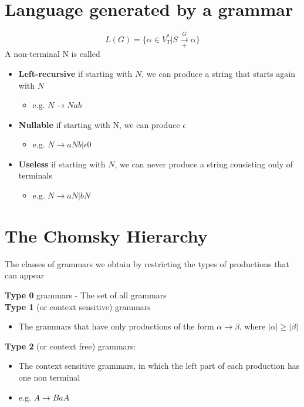 \documentclass{article}[18pt]
\begin{document}
\section{Language generated by a grammar}
$$L(G)=\{\alpha\in V^*_T| S\xrightarrow[+]{G} \alpha \}$$
A non-terminal N is called
\begin{itemize}
	\item \textbf{Left-recursive} if starting with $N$, we can produce a string that starts again with $N$
	\begin{itemize}
		\item e.g. $N\rightarrow Nab$
	\end{itemize}
	\item \textbf{Nullable} if starting with N, we can produce $\epsilon$
	\begin{itemize}
		\item e.g. $N\rightarrow aNb | \epsilon$0
	\end{itemize}
	\item \textbf{Useless} if starting with $N$, we can never produce a string consisting only of terminals
	\begin{itemize}
		\item e.g. $N\rightarrow aN | bN$
	\end{itemize}
\end{itemize}
\section{The Chomsky Hierarchy}
\begin{definition}
The classes of grammars we obtain by restricting the types of productions that can appear
\end{definition}
\textbf{Type 0} grammars - The set of all grammars\\
\textbf{Type 1} (or context sensitive) grammars
\begin{itemize}
	\item The grammars that have only productions of the form $\alpha \rightarrow \beta$, where $|\alpha| \geqslant |\beta|$
\end{itemize}
\textbf{Type 2} (or context free) grammars:
\begin{itemize}
	\item The context sensitive grammars, in which the left part of each production has one non terminal
	\item e.g. $A\rightarrow BaA$
\end{itemize}
\end{document}
